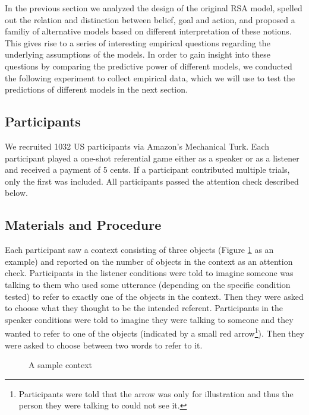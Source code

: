 In the previous section we analyzed the design of the original RSA
model, spelled out the relation and distinction between belief, goal
and action, and proposed a familiy of alternative models based on
different interpretation of these notions. This gives rise to a series
of interesting empirical questions regarding the underlying
assumptions of the models. In order to gain insight into these
questions by comparing the predictive power of different models, we
conducted the following experiment to collect empirical data, which we
will use to test the predictions of different models in the next
section.

\subsection*{Participants}

We recruited 1032 US participants via Amazon's Mechanical Turk. Each
participant played a one-shot referential game either as a speaker or
as a listener and received a payment of 5 cents. If a participant
contributed multiple trials, only the first was included. All
participants passed the attention check described below.

\subsection*{Materials and Procedure}

Each participant saw a context consisting of three objects (Figure
\ref{exp_context} as an example) and reported on the number of objects
in the context as an attention check. Participants in the listener
conditions were told to imagine someone was talking to them who used
some utterance (depending on the specific condition tested) to refer
to exactly one of the objects in the context. Then they were asked to
choose what they thought to be the intended referent. Participants in
the speaker conditions were told to imagine they were talking to
someone and they wanted to refer to one of the objects (indicated by a
small red arrow\footnote{Participants were told that the arrow was
  only for illustration and thus the person they were talking to could
  not see it.}). Then they were asked to choose between two words to
refer to it.

\begin{figure}[htb] 
  \centering
  
  \caption{A sample context}\label{exp_context}
\end{figure}

